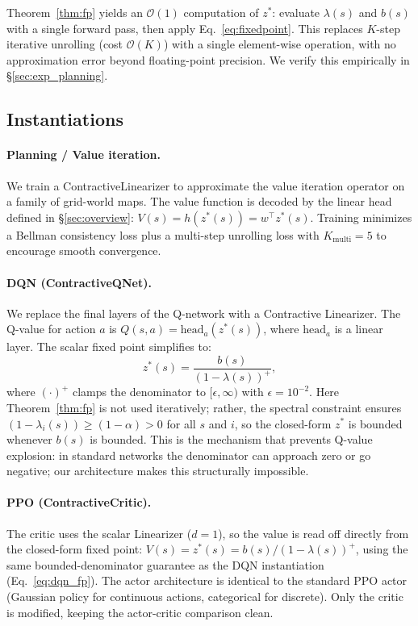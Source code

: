 \documentclass{article}
\newcommand{\zstar}{z^*}                     %
\newcommand{\spb}{\alpha}                    %
\newcommand{\eigs}{\lambda}                  %
\begin{document}
Theorem~\ref{thm:fp} yields an $\mathcal{O}(1)$ computation of $\zstar$:
evaluate $\eigs(s)$ and $b(s)$ with a single forward pass, then apply
Eq.~\eqref{eq:fixedpoint}.
This replaces $K$-step iterative unrolling (cost $\mathcal{O}(K)$) with a single
element-wise operation, with no approximation error beyond floating-point precision.
We verify this empirically in \S\ref{sec:exp_planning}.

\subsection{Instantiations}

\paragraph{Planning / Value iteration.}
We train a ContractiveLinearizer to approximate the value iteration operator on
a family of grid-world maps.
The value function is decoded by the linear head defined in
\S\ref{sec:overview}: $V(s) = h(\zstar(s)) = w^\top \zstar(s)$.
Training minimizes a Bellman consistency loss plus a multi-step unrolling loss
with $K_\text{multi}=5$ to encourage smooth convergence.

\paragraph{DQN (ContractiveQNet).}
We replace the final layers of the Q-network with a Contractive Linearizer.
The Q-value for action $a$ is $Q(s,a) = \text{head}_a(\zstar(s))$, where
$\text{head}_a$ is a linear layer.
The scalar fixed point simplifies to:
\begin{equation}
  \zstar(s) = \frac{b(s)}{(1 - \eigs(s))^+},
  \label{eq:dqn_fp}
\end{equation}
where $(\cdot)^+$ clamps the denominator to $[\epsilon, \infty)$ with $\epsilon=10^{-2}$.
Here Theorem~\ref{thm:fp} is not used iteratively; rather, the spectral constraint
ensures $(1 - \eigs_i(s)) \geq (1-\spb) > 0$ for all $s$ and $i$, so the
closed-form $\zstar$ is bounded whenever $b(s)$ is bounded.
This is the mechanism that prevents Q-value explosion: in standard networks
the denominator can approach zero or go negative; our architecture makes this
structurally impossible.

\paragraph{PPO (ContractiveCritic).}
The critic uses the scalar Linearizer ($d=1$), so the value is read off directly
from the closed-form fixed point: $V(s) = \zstar(s) = b(s) / (1-\eigs(s))^+$,
using the same bounded-denominator guarantee as the DQN instantiation
(Eq.~\eqref{eq:dqn_fp}).
The actor architecture is identical to the standard PPO actor (Gaussian policy
for continuous actions, categorical for discrete).
Only the critic is modified, keeping the actor-critic comparison clean.
\end{document}
